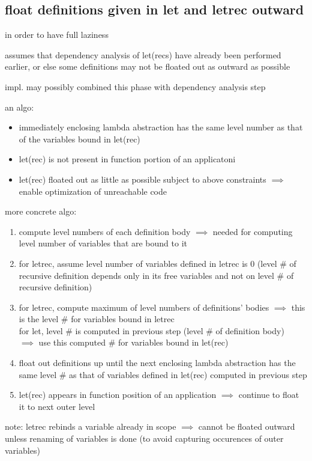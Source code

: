 \documentclass[8pt]{extarticle}
\begin{document}
\begin{multicols*}{2}
\subsection{float definitions given in let and letrec outward}

in order to have full laziness

assumes that dependency analysis of let(recs) have already been performed earlier, or else some definitions may not be floated out as outward as possible

impl. may possibly combined this phase with dependency analysis step

an algo:
\begin{itemize}
\item immediately enclosing lambda abstraction has the same level number as that of the variables bound in let(rec)
\item let(rec) is not present in function portion of an applicatoni
\item let(rec) floated out as little as possible subject to above constraints $\implies$ enable optimization of unreachable code
\end{itemize}

more concrete algo:
\begin{enumerate}
\item compute level numbers of each definition body $\implies$ needed for computing level number of variables that are bound to it
\item for letrec, assume level number of variables defined in letrec is 0 (level \# of recursive definition depends only in its free variables and not on level \# of recursive definition)
\item for letrec, compute maximum of level numbers of definitions' bodies $\implies$ this is the level \# for variables bound in letrec\\
  for let, level \# is computed in previous step (level \# of definition body)\\
  $\implies$ use this computed \# for variables bound in let(rec)
\item float out definitions up until the next enclosing lambda abstraction has the same level \# as that of variables defined in let(rec) computed in previous step
\item let(rec) appears in function position of an application $\implies$ continue to float it to next outer level
\end{enumerate}

note: letrec rebinds a variable already in scope $\implies$ cannot be floated outward unless renaming of variables is done (to avoid capturing occurences of outer variables)


\end{multicols*}
\end{document}
